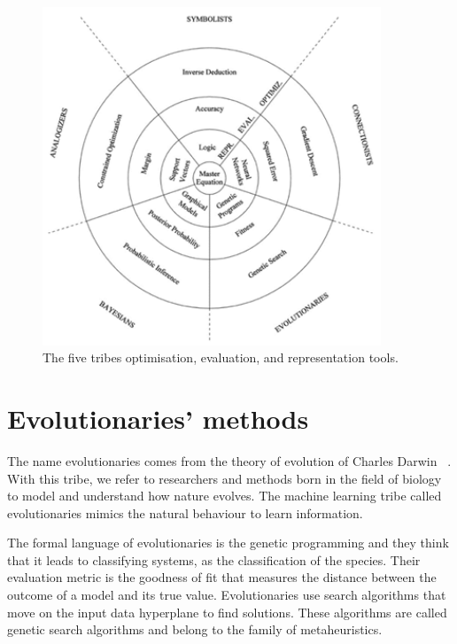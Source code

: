 \begin{figure}[hbt!]
\centering
\includegraphics[width=0.9\textwidth]{SectionLetsMath/nonLinearMethods_fig/fig_tribes.png}
\captionsetup{type=figure}
\caption{The five tribes optimisation, evaluation, and representation tools.}
\label{fig_tribes}
\end{figure}


\section{Evolutionaries’ methods}

The name evolutionaries comes from the theory of evolution of Charles Darwin ~\cite{Darwin1859}. With this tribe, we refer to researchers and methods born in the field of biology to model and understand how nature evolves. The machine learning tribe called evolutionaries mimics the natural behaviour to learn information.\par

The formal language of evolutionaries is the genetic programming and they think that it leads to classifying systems, as the classification of the species. Their evaluation metric is the goodness of fit that measures the distance between the outcome of a model and its true value. Evolutionaries use search algorithms that move on the input data hyperplane to find solutions. These algorithms are called genetic search algorithms and belong to the family of metaheuristics.

